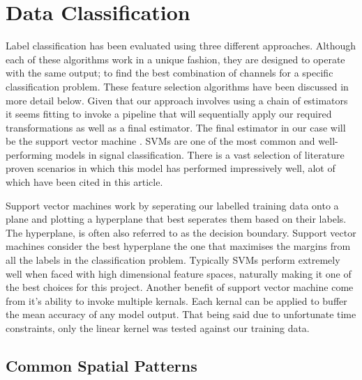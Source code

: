 \documentclass[11pt]{article}
\begin{document}
\section{Data Classification}

Label classification has been evaluated using three different approaches. Although each of these algorithms work in a unique fashion, they are designed to operate with the same output; to find the best combination of channels for a specific classification problem. These feature selection algorithms have been discussed in more detail below. Given that our approach involves using a chain of estimators it seems fitting to invoke a pipeline that will sequentially apply our required transformations as well as a final estimator. The final estimator in our case will be the support vector machine \cite{cortes1995support}. SVMs are one of the most common and well-performing models in signal classification. There is a vast selection of literature proven scenarios in which this model has performed impressively well, alot of which have been cited in this article. 

Support vector machines work by seperating our labelled training data onto a plane and plotting a hyperplane that best seperates them based on their labels. The hyperplane, is often also referred to as the decision boundary. Support vector machines consider the best hyperplane the one that maximises the margins from all the labels in the classification problem. Typically SVMs perform extremely well when faced with high dimensional feature spaces, naturally making it one of the best choices for this project. Another benefit of support vector machine come from it's ability to invoke multiple kernals. Each kernal can be applied to buffer the mean accuracy of any model output. That being said due to unfortunate time constraints, only the linear kernel was tested against our training data.

\subsection{Common Spatial Patterns}
\end{document}
